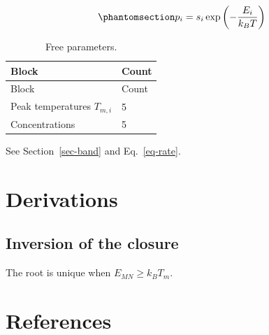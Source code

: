 \documentclass[
  number]{elsarticle}
\begin{document}
\begin{equation}\protect\phantomsection\label{eq-rate}{p_i = s_i \exp\left(-\frac{E_i}{k_B T}\right)}\end{equation}

\begin{longtable}[]{@{}ll@{}}
\caption{Free parameters.}\label{tbl-params}\tabularnewline
\toprule\noalign{}
Block & Count \\
\midrule\noalign{}
\endfirsthead
\toprule\noalign{}
Block & Count \\
\midrule\noalign{}
\endhead
\bottomrule\noalign{}
\endlastfoot
Peak temperatures \(T_{m,i}\) & 5 \\
Concentrations & 5 \\
\end{longtable}

See Section~\ref{sec-band} and Eq.~\ref{eq-rate}.

\appendix

\section{Derivations}\label{sec-appendix}

\subsection{Inversion of the closure}\label{sec-app-inversion}

The root is unique when \(E_{MN} \ge k_B T_m\).

\section*{References}\label{references}

\renewcommand{\bibsection}{}

\end{document}
